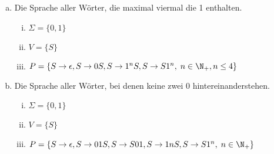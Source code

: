   \begin{enumerate}[a)]
    \item Die Sprache aller Wörter, die maximal viermal die 1 enthalten.

    \begin{enumerate}[i)]
      \item $\Sigma = \{ 0,1 \}$
      \item $V = \{S \} $
      \item $P = \{ S \to \epsilon, S \to 0S, S \to 1^n S, S \to S 1^n, \; n \in \N_{+}, n \leq 4 \}$
    \end{enumerate}

    \item Die Sprache aller Wörter, bei denen keine zwei 0 hintereinanderstehen.

    \begin{enumerate}[i)]
      \item $\Sigma = \{ 0,1 \}$
      \item $V = \{S \} $
      \item $P = \{ S \to \epsilon,
      S \to 01S, S \to S 01,
      S \to 1n S,
      S \to S 1^{n},
      \; n \in \N_{+} \}$
    \end{enumerate}


  \end{enumerate}





